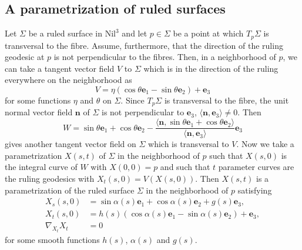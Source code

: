 \documentclass[11pt]{amsart}
\begin{document}
\subsection{A parametrization of ruled surfaces}
Let $\Sigma$ be a ruled surface in $\text{Nil}^3$ and let
$p\in\Sigma$ be a point at which $T_p \Sigma$ is transversal to
the fibre. Assume, furthermore, that  the direction of the ruling
geodesic at $p$ is not perpendicular to the fibres. Then, in a
neighborhood of $p$, we can take a tangent vector field $V$ to
$\Sigma$ which is in the direction of the ruling everywhere on the
neighborhood as
$$ V =\eta(\cos\theta{\mathbf{e}}_1 -\sin\theta{\mathbf{e}}_2)+{\mathbf{e}}_3 $$
for some functions $\eta$ and $\theta$ on $\Sigma$. Since $T_p
\Sigma$ is transversal to the fibre, the unit normal vector field
${\mathbf{n}}$ of $\Sigma$ is not perpendicular to ${\mathbf{e}}_3$,
$\langle{\mathbf{n}},{\mathbf{e}}_3\rangle  \neq 0$. Then
$$
 W =\sin\theta{\mathbf{e}}_1 + \cos\theta{\mathbf{e}}_2
   - \frac{\langle{\mathbf{n}}, \sin\theta{\mathbf{e}}_1 + \cos\theta{\mathbf{e}}_2\rangle}
   {\langle{\mathbf{n}},{\mathbf{e}}_3\rangle} {\mathbf{e}}_3
$$
gives another tangent vector field on $\Sigma$ which is
transversal to $V$. Now we take a parametrization $X(s,t)$ of
$\Sigma$ in the neighborhood of $p$ such that $X(s,0)$ is the
integral curve of $W$ with $X(0,0)=p$ and such that $t$ parameter
curves are the ruling geodesics with $X_t(s,0)=V(X(s,0))$. Then
$X(s,t)$ is a parametrization of the ruled surface $\Sigma$ in the
neighborhood of $p$ satisfying
\begin{equation}\label{eq:parametrization}
\begin{split}
   X_s (s,0) &=\sin \alpha (s){\mathbf{e}}_1 + \cos\alpha (s){\mathbf{e}}_2 + g(s){\mathbf{e}}_3 , \\
   X_t (s,0) &=h(s)(\cos\alpha (s){\mathbf{e}}_1 -  \sin \alpha (s){\mathbf{e}}_2) + {\mathbf{e}}_3,  \\
   \nabla_{X_t} X_t &=0
\end{split}
\end{equation}
for some smooth functions $h(s)$, $\alpha (s)$ and $g(s)$.
\end{document}
